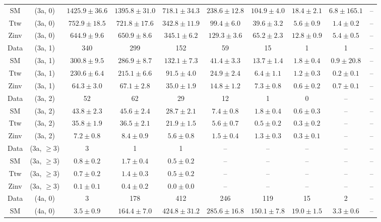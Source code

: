 \begin{table}[h!]
{\begin{tabular}{cccccccccc}
	SM & (3a, 0) & $1425.9\pm 36.6$ & $1395.8\pm 31.0$ & $718.1\pm 34.3$ & $238.6\pm 12.8$ & $104.9\pm 4.0$ & $18.4\pm 2.1$ & $6.8\pm 165.1$ & -- \\[0.5ex] 
	Ttw & (3a, 0) & $752.9\pm 18.5$ & $721.8\pm 17.6$ & $342.8\pm 11.9$ & $99.4\pm 6.0$ & $39.6\pm 3.2$ & $5.6\pm 0.9$ & $1.4\pm 0.2$ & -- \\[0.5ex] 
	Zinv & (3a, 0) & $644.9\pm 9.6$ & $650.9\pm 8.6$ & $345.1\pm 6.2$ & $129.3\pm 3.6$ & $65.2\pm 2.3$ & $12.8\pm 0.9$ & $5.4\pm 0.5$ & -- \\[0.5ex] 
	Data & (3a, 1) & 340 & 299 & 152 & 59 & 15 & 1 & 1 & -- \\[0.5ex] 
	SM & (3a, 1) & $300.8\pm 9.5$ & $286.9\pm 8.7$ & $132.1\pm 7.3$ & $41.4\pm 3.3$ & $13.7\pm 1.4$ & $1.8\pm 0.4$ & $0.9\pm 20.8$ & -- \\[0.5ex] 
	Ttw & (3a, 1) & $230.6\pm 6.4$ & $215.1\pm 6.6$ & $91.5\pm 4.0$ & $24.9\pm 2.4$ & $6.4\pm 1.1$ & $1.2\pm 0.3$ & $0.2\pm 0.1$ & -- \\[0.5ex] 
	Zinv & (3a, 1) & $64.3\pm 3.0$ & $67.1\pm 2.8$ & $35.0\pm 1.9$ & $14.8\pm 1.2$ & $7.3\pm 0.8$ & $0.6\pm 0.2$ & $0.7\pm 0.1$ & -- \\[0.5ex] 
	Data & (3a, 2) & 52 & 62 & 29 & 12 & 1 & 0 & -- & -- \\[0.5ex] 
	SM & (3a, 2) & $43.8\pm 2.3$ & $45.6\pm 2.4$ & $28.7\pm 2.1$ & $7.4\pm 0.8$ & $1.8\pm 0.4$ & $0.6\pm 0.3$ & -- & -- \\[0.5ex] 
	Ttw & (3a, 2) & $35.8\pm 1.9$ & $36.5\pm 2.1$ & $21.9\pm 1.5$ & $5.6\pm 0.7$ & $0.5\pm 0.2$ & $0.3\pm 0.2$ & -- & -- \\[0.5ex] 
	Zinv & (3a, 2) & $7.2\pm 0.8$ & $8.4\pm 0.9$ & $5.6\pm 0.8$ & $1.5\pm 0.4$ & $1.3\pm 0.3$ & $0.3\pm 0.1$ & -- & -- \\[0.5ex] 
	Data & (3a, $\ge3$) & 3 & 1 & 1 & -- & -- & -- & -- & -- \\[0.5ex] 
	SM & (3a, $\ge3$) & $0.8\pm 0.2$ & $1.7\pm 0.4$ & $0.5\pm 0.2$ & -- & -- & -- & -- & -- \\[0.5ex] 
	Ttw & (3a, $\ge3$) & $0.7\pm 0.2$ & $1.4\pm 0.3$ & $0.5\pm 0.2$ & -- & -- & -- & -- & -- \\[0.5ex] 
	Zinv & (3a, $\ge3$) & $0.1\pm 0.1$ & $0.4\pm 0.2$ & $0.0\pm 0.0$ & -- & -- & -- & -- & -- \\[0.5ex] 
	Data & (4a, 0) & 3 & 178 & 412 & 246 & 119 & 15 & 2 & -- \\[0.5ex] 
	SM & (4a, 0) & $3.5\pm 0.9$ & $164.4\pm 7.0$ & $424.8\pm 31.2$ & $285.6\pm 16.8$ & $150.1\pm 7.8$ & $19.0\pm 1.5$ & $3.3\pm 0.6$ & -- \\[0.5ex] 

\end{tabular}}
\end{table}
